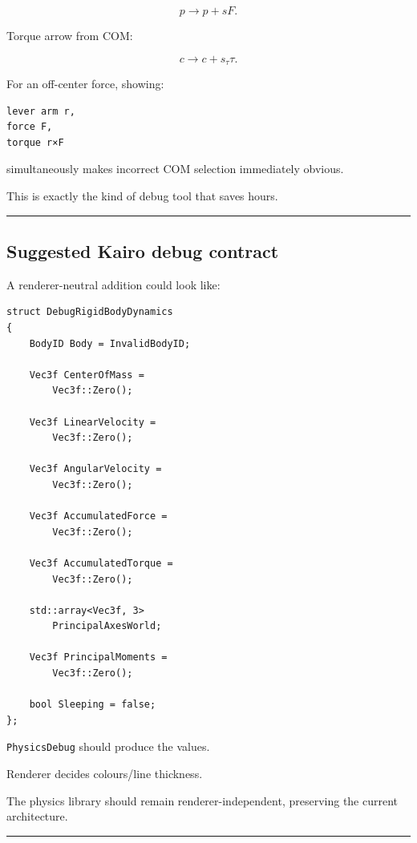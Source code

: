 \[
p\rightarrow p+sF.
\]

Torque arrow from COM:

\[
c\rightarrow c+s_\tau\tau.
\]

For an off-center force, showing:

\begin{verbatim}
lever arm r,
force F,
torque r×F
\end{verbatim}

simultaneously makes incorrect COM selection immediately obvious.

This is exactly the kind of debug tool that saves hours.

\begin{center}\rule{0.5\linewidth}{0.5pt}\end{center}

\subsection{Suggested Kairo debug contract}\label{06-engine-ii-ch039-suggested-kairo-debug-contract}

\hypertarget{06-engine-ii-ch039-suggested-kairo-debug-contract}{}

A renderer-neutral addition could look like:

\begin{verbatim}
struct DebugRigidBodyDynamics
{
    BodyID Body = InvalidBodyID;

    Vec3f CenterOfMass =
        Vec3f::Zero();

    Vec3f LinearVelocity =
        Vec3f::Zero();

    Vec3f AngularVelocity =
        Vec3f::Zero();

    Vec3f AccumulatedForce =
        Vec3f::Zero();

    Vec3f AccumulatedTorque =
        Vec3f::Zero();

    std::array<Vec3f, 3>
        PrincipalAxesWorld;

    Vec3f PrincipalMoments =
        Vec3f::Zero();

    bool Sleeping = false;
};
\end{verbatim}

\texttt{PhysicsDebug} should produce the values.

Renderer decides colours/line thickness.

The physics library should remain renderer-independent, preserving the current architecture.

\begin{center}\rule{0.5\linewidth}{0.5pt}\end{center}

